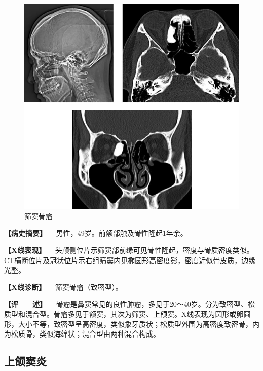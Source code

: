 \begin{figure}[!htbp]
 \centering
 \includegraphics{./images/Image00428.jpg}
 \captionsetup{justification=centering}
 \caption{筛窦骨瘤}
 \label{fig7-4-2}
  \end{figure} 

\textbf{【病史摘要】} 　男性，49岁。前额部触及骨性隆起1年余。

\textbf{【X线表现】}
　头颅侧位片示筛窦部前缘可见骨性隆起，密度与骨质密度类似。CT横断位片及冠状位片示右组筛窦内见椭圆形高密度影，密度近似骨皮质，边缘光整。

\textbf{【X线诊断】} 　筛窦骨瘤（致密型）。

\textbf{【评　　述】}
　骨瘤是鼻窦常见的良性肿瘤，多见于20～40岁。分为致密型、松质型和混合型。骨瘤多见于额窦，其次为筛窦、上颌窦。X线表现为圆形或卵圆形，大小不等，致密型呈高密度，类似象牙质状；松质型外围为高密度致密骨，内为松质骨，类似海绵状；混合型由两种混合构成。

\subsection{上颌窦炎}

